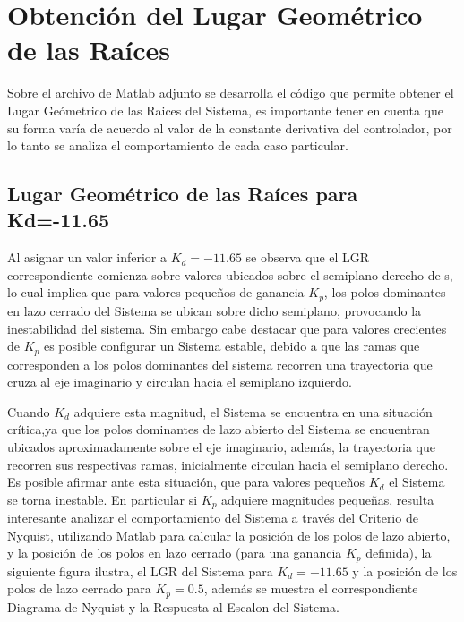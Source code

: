 \documentclass[12pt,letterpaper]{article}
\begin{document}
\section{Obtención del Lugar Geométrico de las Raíces}
Sobre el archivo de Matlab adjunto se desarrolla el código que permite obtener el Lugar Geómetrico de las Raices del Sistema, es importante tener en cuenta que su forma varía de acuerdo al valor de la constante derivativa del controlador, por lo tanto se analiza el comportamiento de cada caso particular.
\subsection{Lugar Geométrico de las Raíces para Kd=-11.65}
Al asignar un valor inferior a $K_{d}=-11.65$ se observa que el LGR correspondiente comienza sobre valores ubicados sobre el semiplano derecho de s, lo cual implica que para valores pequeños de ganancia $K_{p}$, los polos dominantes en lazo cerrado del Sistema se ubican sobre dicho semiplano, provocando la inestabilidad del sistema.
Sin embargo cabe destacar que para valores crecientes de $K_{p}$ es posible configurar un Sistema estable, debido a que las ramas que corresponden a los polos dominantes del sistema recorren una trayectoria que cruza al eje imaginario y circulan hacia el semiplano izquierdo. 

Cuando $K_{d}$ adquiere esta magnitud, el Sistema se encuentra en una situación crítica,ya que los polos dominantes de lazo abierto del Sistema se encuentran ubicados aproximadamente sobre el eje imaginario, además, la trayectoria que recorren sus respectivas ramas, inicialmente circulan hacia el semiplano derecho. Es posible afirmar ante esta situación, que para valores pequeños $K_{d}$ el Sistema se torna inestable.
En particular si $K_{p}$ adquiere magnitudes pequeñas, resulta interesante analizar el comportamiento del Sistema a través del Criterio de Nyquist, utilizando Matlab para calcular la posición de los polos de lazo abierto, y la posición de los polos en lazo cerrado (para una ganancia $K_{p}$ definida), la siguiente figura ilustra, el LGR del Sistema para $K_{d}=-11.65$ y la posición de los polos de lazo cerrado para $K_{p}=0.5$, además se muestra el correspondiente Diagrama de Nyquist y la Respuesta al Escalon del Sistema.
\end{document}
